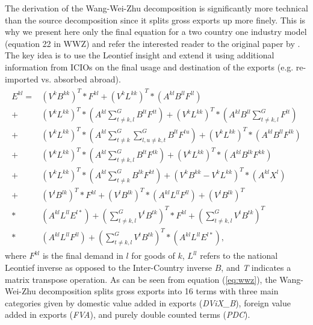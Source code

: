 \documentclass[a4paper]{article}\usepackage[]{graphicx}\usepackage[]{color}
\begin{document}
The derivation of the Wang-Wei-Zhu decomposition is significantly
more technical than the source decomposition since it splits gross
exports up more finely. This is why we present here only the final
equation for a two country one industry model (equation 22 in WWZ)
and refer the interested reader to the original paper by \citet{wang2014quantifying}.
The key idea is to use the Leontief insight and extend it using additional
information from ICIOs on the final usage and destination of the exports
(e.g. re-imported vs. absorbed abroad). 
\begin{align}
\begin{split}E^{kl}= & \left(V^{k}B^{kk}\right)^{T}*F^{kl}+\left(V^{k}L^{kk}\right)^{T}*\left(A^{kl}B^{ll}F^{ll}\right)\\
+ & \left(V^{k}L^{kk}\right)^{T}*(A^{kl}\sum_{t\neq k,l}^{G}B^{lt}F^{tt})+\left(V^{k}L^{kk}\right)^{T}*(A^{kl}B^{ll}\sum_{t\neq k,l}^{G}F^{lt})\\
+ & \left(V^{k}L^{kk}\right)^{T}*(A^{kl}\sum_{t\neq k}^{G}\sum_{l,u\neq k,t}^{G}B^{lt}F^{tu})+\left(V^{k}L^{kk}\right)^{T}*\left(A^{kl}B^{ll}F^{lk}\right)\\
+ & \left(V^{k}L^{kk}\right)^{T}*(A^{kl}\sum_{t\neq k,l}^{G}B^{lt}F^{tk})+\left(V^{k}L^{kk}\right)^{T}*\left(A^{kl}B^{lk}F^{kk}\right)\\
+ & \left(V^{k}L^{kk}\right)^{T}*(A^{kl}\sum_{t\neq k}^{G}B^{lk}F^{kt})+\left(V^{k}B^{kk}-V^{k}L^{kk}\right)^{T}*\left(A^{kl}X^{l}\right)\\
+ & \left(V^{l}B^{lk}\right)^{T}*F^{kl}+\left(V^{l}B^{lk}\right)^{T}*\left(A^{kl}L^{ll}F^{ll}\right)+\left(V^{l}B^{lk}\right)^{T}\\
* & \left(A^{kl}L^{ll}E^{l*}\right)+(\sum_{t\neq k,l}^{G}V^{t}B^{tk})^{T}*F^{kl}+(\sum_{t\neq k,l}^{G}V^{t}B^{tk})^{T}\\
* & \left(A^{kl}L^{ll}F^{ll}\right)+(\sum_{t\neq k,l}^{G}V^{t}B^{tk})^{T}*\left(A^{kl}L^{ll}E^{l*}\right),
\end{split}
\label{eq:wwz}
\end{align}
where $F^{kl}$ is the final demand in $l$ for goods of $k$, $L^{ll}$
refers to the national Leontief inverse as opposed to the Inter-Country
inverse $B$, and \textit{T} indicates a matrix transpose operation.
As can be seen from equation (\ref{eq:wwz}), the Wang-Wei-Zhu decomposition
splits gross exports into 16 terms with three main categories given
by domestic value added in exports (\textit{DViX\_B}), foreign value
added in exports (\textit{FVA}), and purely double counted terms (\textit{PDC}).
\end{document}

